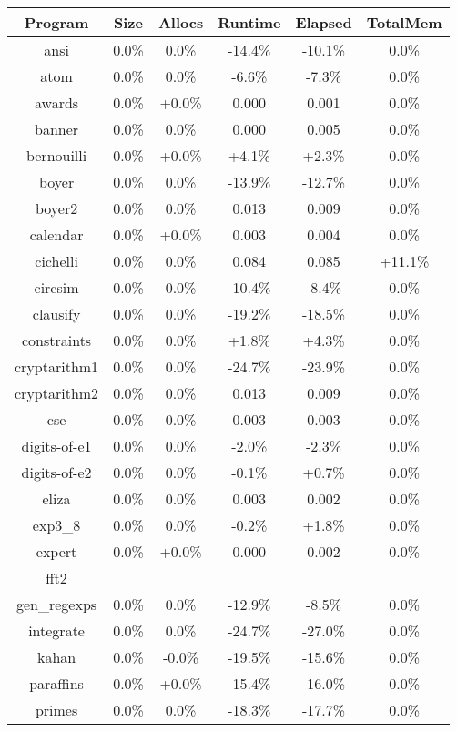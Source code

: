 \begin{tabular}{ c c c c c c }
Program & Size & Allocs & Runtime & Elapsed & TotalMem\\
\hline
ansi &  0.0\% &  0.0\% & -14.4\% & -10.1\% &  0.0\%\\
atom &  0.0\% &  0.0\% & -6.6\% & -7.3\% &  0.0\%\\
awards &  0.0\% & +0.0\% & 0.000 & 0.001 &  0.0\%\\
banner &  0.0\% &  0.0\% & 0.000 & 0.005 &  0.0\%\\
bernouilli &  0.0\% & +0.0\% & +4.1\% & +2.3\% &  0.0\%\\
boyer &  0.0\% &  0.0\% & -13.9\% & -12.7\% &  0.0\%\\
boyer2 &  0.0\% &  0.0\% & 0.013 & 0.009 &  0.0\%\\
calendar &  0.0\% & +0.0\% & 0.003 & 0.004 &  0.0\%\\
cichelli &  0.0\% &  0.0\% & 0.084 & 0.085 & +11.1\%\\
circsim &  0.0\% &  0.0\% & -10.4\% & -8.4\% &  0.0\%\\
clausify &  0.0\% &  0.0\% & -19.2\% & -18.5\% &  0.0\%\\
constraints &  0.0\% &  0.0\% & +1.8\% & +4.3\% &  0.0\%\\
cryptarithm1 &  0.0\% &  0.0\% & -24.7\% & -23.9\% &  0.0\%\\
cryptarithm2 &  0.0\% &  0.0\% & 0.013 & 0.009 &  0.0\%\\
cse &  0.0\% &  0.0\% & 0.003 & 0.003 &  0.0\%\\
digits-of-e1 &  0.0\% &  0.0\% & -2.0\% & -2.3\% &  0.0\%\\
digits-of-e2 &  0.0\% &  0.0\% & -0.1\% & +0.7\% &  0.0\%\\
eliza &  0.0\% &  0.0\% & 0.003 & 0.002 &  0.0\%\\
exp3\_8 &  0.0\% &  0.0\% & -0.2\% & +1.8\% &  0.0\%\\
expert &  0.0\% & +0.0\% & 0.000 & 0.002 &  0.0\%\\
fft2 &  &  &  &  & \\
gen\_regexps &  0.0\% &  0.0\% & -12.9\% & -8.5\% &  0.0\%\\
integrate &  0.0\% &  0.0\% & -24.7\% & -27.0\% &  0.0\%\\
kahan &  0.0\% & -0.0\% & -19.5\% & -15.6\% &  0.0\%\\
paraffins &  0.0\% & +0.0\% & -15.4\% & -16.0\% &  0.0\%\\
primes &  0.0\% &  0.0\% & -18.3\% & -17.7\% &  0.0\%\\

\end{tabular}
